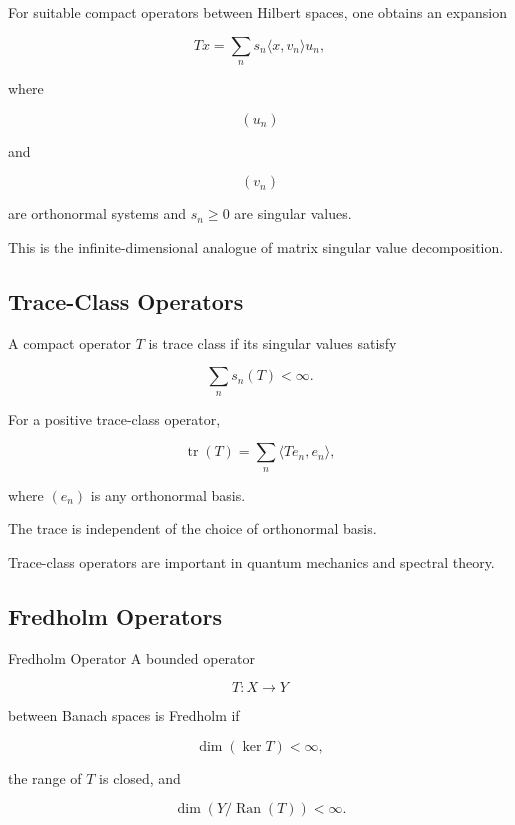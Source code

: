 For suitable compact operators between Hilbert spaces, one obtains an
expansion

\[
\boxed{
Tx
=
\sum_{n}
s_n
\langle x,v_n\rangle u_n,
}
\]

where

\[
(u_n)
\]

and

\[
(v_n)
\]

are orthonormal systems and \(s_n\geq0\) are singular values.

This is the infinite-dimensional analogue of matrix singular value
decomposition.

\subsection{Trace-Class Operators}
\label{subsec:trace-class-operators}

A compact operator \(T\) is trace class if its singular values satisfy

\[
\boxed{
\sum_n s_n(T)<\infty.
}
\]

For a positive trace-class operator,

\[
\boxed{
\operatorname{tr}(T)
=
\sum_n
\langle Te_n,e_n\rangle,
}
\]

where \((e_n)\) is any orthonormal basis.

The trace is independent of the choice of orthonormal basis.

Trace-class operators are important in quantum mechanics and spectral
theory.

\subsection{Fredholm Operators}
\label{subsec:fredholm-operators}

\begin{definitionbox}{Fredholm Operator}
A bounded operator

\[
T:X\to Y
\]

between Banach spaces is Fredholm if

\[
\boxed{
\dim(\ker T)<\infty,
}
\]

the range of \(T\) is closed, and

\[
\boxed{
\dim(Y/\operatorname{Ran}(T))<\infty.
}
\]
\end{definitionbox}

